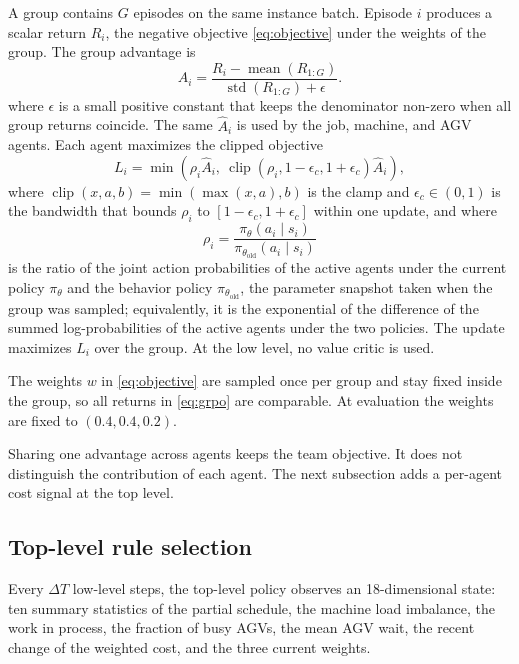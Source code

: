 A group contains $G$ episodes on the same instance batch. Episode $i$
produces a scalar return $R_i$, the negative objective \eqref{eq:objective}
under the weights of the group. The group advantage is
\begin{equation}
\hat{A}_i=\frac{R_i-\operatorname{mean}(R_{1:G})}
{\operatorname{std}(R_{1:G})+\epsilon}.
\label{eq:grpo}
\end{equation}
where $\epsilon$ is a small positive constant that keeps the denominator
non-zero when all group returns coincide. The same $\hat{A}_i$ is used by the
job, machine, and AGV agents. Each agent
maximizes the clipped objective
\begin{equation}
L_i=\min\left(\rho_i\hat{A}_i,\
\operatorname{clip}(\rho_i,1-\epsilon_c,1+\epsilon_c)\hat{A}_i\right),
\end{equation}
where $\operatorname{clip}(x,a,b)=\min(\max(x,a),b)$ is the clamp and
$\epsilon_c\in(0,1)$ is the bandwidth that bounds $\rho_i$ to
$[1-\epsilon_c,1+\epsilon_c]$ within one update, and where
\begin{equation}
\rho_i=\frac{\pi_\theta(a_i\mid s_i)}
{\pi_{\theta_{\mathrm{old}}}(a_i\mid s_i)}
\end{equation}
is the ratio of the joint action probabilities of the active agents under the
current policy $\pi_\theta$ and the behavior policy
$\pi_{\theta_{\mathrm{old}}}$, the parameter snapshot taken when the group was
sampled; equivalently, it is the exponential of the difference of the summed
log-probabilities of the active agents under the two policies. The update
maximizes $L_i$ over the group. At the low level, no value critic is used.

The weights $w$ in \eqref{eq:objective} are sampled once per group and stay
fixed inside the group, so all returns in \eqref{eq:grpo} are comparable. At
evaluation the weights are fixed to $(0.4,0.4,0.2)$.

Sharing one advantage across agents keeps the team objective. It does not
distinguish the contribution of each agent. The next subsection adds a
per-agent cost signal at the top level.

\subsection{Top-level rule selection}

Every $\Delta T$ low-level steps, the top-level policy observes an
18-dimensional state: ten summary statistics of the partial schedule, the
machine load imbalance, the work in process, the fraction of busy AGVs, the
mean AGV wait, the recent change of the weighted cost, and the three current
weights.

